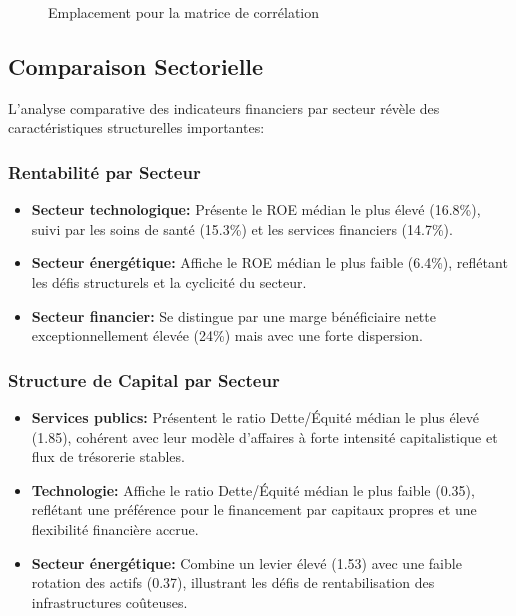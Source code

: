 \documentclass[12pt]{article}
\begin{document}
\begin{figure}[H]
    \centering
    \caption{Emplacement pour la matrice de corrélation}
    \label{fig:correlation}
\end{figure}

\subsection{Comparaison Sectorielle}
L'analyse comparative des indicateurs financiers par secteur révèle des caractéristiques structurelles importantes:

\subsubsection{Rentabilité par Secteur}
\begin{itemize}
    \item \textbf{Secteur technologique:} Présente le ROE médian le plus élevé (16.8\%), suivi par les soins de santé (15.3\%) et les services financiers (14.7\%).
    
    \item \textbf{Secteur énergétique:} Affiche le ROE médian le plus faible (6.4\%), reflétant les défis structurels et la cyclicité du secteur.
    
    \item \textbf{Secteur financier:} Se distingue par une marge bénéficiaire nette exceptionnellement élevée (24\%) mais avec une forte dispersion.
\end{itemize}

\subsubsection{Structure de Capital par Secteur}
\begin{itemize}
    \item \textbf{Services publics:} Présentent le ratio Dette/Équité médian le plus élevé (1.85), cohérent avec leur modèle d'affaires à forte intensité capitalistique et flux de trésorerie stables.
    
    \item \textbf{Technologie:} Affiche le ratio Dette/Équité médian le plus faible (0.35), reflétant une préférence pour le financement par capitaux propres et une flexibilité financière accrue.
    
    \item \textbf{Secteur énergétique:} Combine un levier élevé (1.53) avec une faible rotation des actifs (0.37), illustrant les défis de rentabilisation des infrastructures coûteuses.
\end{itemize}
\end{document}
